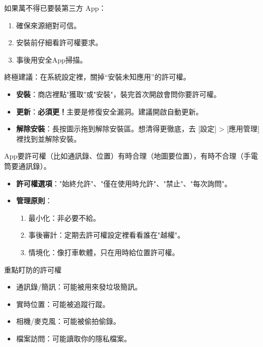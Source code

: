 如果萬不得已要裝第三方 App：

\begin{enumerate}
  \item 確保來源絕對可信。
  \item 安裝前仔細看許可權要求。
  \item 事後用安全App掃描。
\end{enumerate}

終極建議：在系統設定裡，關掉“安裝未知應用”的許可權。


\begin{itemize}
  \item \textbf{安裝}：商店裡點"獲取"或"安裝"，裝完首次開啟會問你要許可權。
  \item \textbf{更新}：\textbf{必須更！}主要是修復安全漏洞。建議開啟自動更新。
  \item \textbf{解除安裝}：長按圖示拖到解除安裝區。想清得更徹底，去 [設定] > [應用管理] 裡找到並解除安裝。
\end{itemize}


App要許可權（比如通訊錄、位置）有時合理（地圖要位置），有時不合理（手電筒要通訊錄）。

\begin{itemize}
  \item \textbf{許可權選項}："始終允許"、"僅在使用時允許"、"禁止"、"每次詢問"。
  \item \textbf{管理原則}：
  \begin{enumerate}
    \item 最小化：非必要不給。
    \item 事後審計：定期去許可權設定裡看看誰在"越權"。
    \item 情境化：像打車軟體，只在用時給位置許可權。
  \end{enumerate}
\end{itemize}

\begin{tcbwarn}{重點盯防的許可權}
\begin{itemize}
  \item 通訊錄/簡訊：可能被用來發垃圾簡訊。
  \item 實時位置：可能被追蹤行蹤。
  \item 相機/麥克風：可能被偷拍偷錄。
  \item 檔案訪問：可能讀取你的隱私檔案。
\end{itemize}

\end{tcbwarn}

